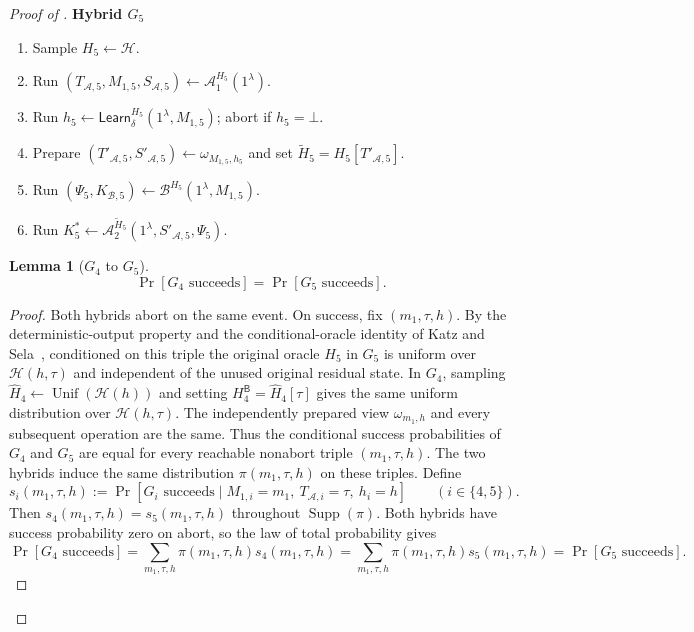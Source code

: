 \documentclass[11pt]{article}
\newtheorem{lemma}[lemma]{Lemma}
\newcommand{\cA}{\mathcal{A}}
\newcommand{\cB}{\mathcal{B}}
\newcommand{\cH}{\mathcal{H}}
\newcommand{\Unif}{\operatorname{Unif}}
\newcommand{\Supp}{\operatorname{Supp}}
\newcommand{\Learn}{\mathsf{Learn}}
\newenvironment{hybrid}[1]{%
  \par\medskip
  \noindent\textbf{#1}
  \begin{enumerate}[leftmargin=2.5em,label=\arabic*.,itemsep=0.25em,topsep=0.35em]
}{%
  \end{enumerate}
  \medskip
}
\begin{document}
\begin{proof}[Proof of ]
\begin{hybrid}{Hybrid \(G_5\)}
  \item Sample \(H_5\leftarrow\cH\).
  \item Run
  \((T_{\cA,5},M_{1,5},S_{\cA,5})
  \leftarrow\cA_1^{H_5}(1^\lambda)\).
  \item Run
  \(h_5\leftarrow\Learn_\delta^{H_5}(1^\lambda,M_{1,5})\); abort if
  \(h_5=\bot\).
  \item Prepare
  \((T'_{\cA,5},S'_{\cA,5})\leftarrow\omega_{M_{1,5},h_5}\) and set
  \(\widetilde H_5=H_5[T'_{\cA,5}]\).
  \item Run
  \((\Psi_5,K_{\cB,5})
  \leftarrow\cB^{H_5}(1^\lambda,M_{1,5})\).
  \item Run
  \(K^*_5
  \leftarrow\cA_2^{\widetilde H_5}
  (1^\lambda,S'_{\cA,5},\Psi_5)\).
\end{hybrid}

\begin{lemma}[\(G_4\) to \(G_5\)]\label{lem:g4-g5}
\[
  \Pr[G_4\text{ succeeds}]
  =
  \Pr[G_5\text{ succeeds}].
\]
\end{lemma}

\begin{proof}
Both hybrids abort on the same event. On success, fix
\((m_1,\tau,h)\). By the deterministic-output property and the
conditional-oracle identity of Katz and Sela~\cite[Lemma~6]{KatzSela24},
conditioned on this triple the
original oracle \(H_5\) in \(G_5\) is uniform over \(\cH(h,\tau)\) and
independent of the unused original residual state. In \(G_4\), sampling
\(\widehat H_4\leftarrow\Unif(\cH(h))\) and setting
\(H^{\mathsf B}_4=\widehat H_4[\tau]\) gives the
same uniform distribution over \(\cH(h,\tau)\). The independently prepared
view \(\omega_{m_1,h}\) and every subsequent operation are the same.
Thus the conditional success probabilities of \(G_4\) and \(G_5\) are equal
for every reachable nonabort triple \((m_1,\tau,h)\). The two hybrids induce
the same distribution \(\pi(m_1,\tau,h)\) on these triples. Define
\[
  s_i(m_1,\tau,h)
  :=
  \Pr[G_i\text{ succeeds}\mid
    M_{1,i}=m_1,\ T_{\cA,i}=\tau,\ h_i=h]
  \qquad (i\in\{4,5\}).
\]
Then \(s_4(m_1,\tau,h)=s_5(m_1,\tau,h)\) throughout \(\Supp(\pi)\).
Both hybrids have success probability zero on abort, so the law of total
probability gives
\[
  \Pr[G_4\text{ succeeds}]
  =
  \sum_{m_1,\tau,h}\pi(m_1,\tau,h)
    s_4(m_1,\tau,h)
  =
  \sum_{m_1,\tau,h}\pi(m_1,\tau,h)
    s_5(m_1,\tau,h)
  =
  \Pr[G_5\text{ succeeds}].
\]
\end{proof}


\end{proof}
\end{document}

